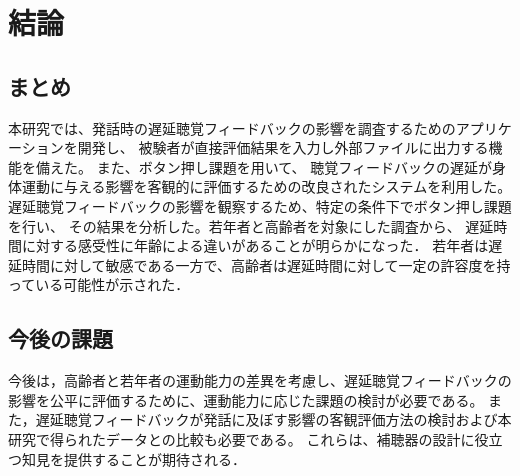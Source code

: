 \section{結論}
\subsection{まとめ}
本研究では、発話時の遅延聴覚フィードバックの影響を調査するためのアプリケーションを開発し、
被験者が直接評価結果を入力し外部ファイルに出力する機能を備えた。
また、ボタン押し課題を用いて、
聴覚フィードバックの遅延が身体運動に与える影響を客観的に評価するための改良されたシステムを利用した。
遅延聴覚フィードバックの影響を観察するため、特定の条件下でボタン押し課題を行い、
その結果を分析した。若年者と高齢者を対象にした調査から、
遅延時間に対する感受性に年齢による違いがあることが明らかになった．
若年者は遅延時間に対して敏感である一方で、高齢者は遅延時間に対して一定の許容度を持っている可能性が示された．
\subsection{今後の課題}
今後は，高齢者と若年者の運動能力の差異を考慮し、遅延聴覚フィードバックの影響を公平に評価するために、運動能力に応じた課題の検討が必要である。
また，遅延聴覚フィードバックが発話に及ぼす影響の客観評価方法の検討および本研究で得られたデータとの比較も必要である。
これらは、補聴器の設計に役立つ知見を提供することが期待される．